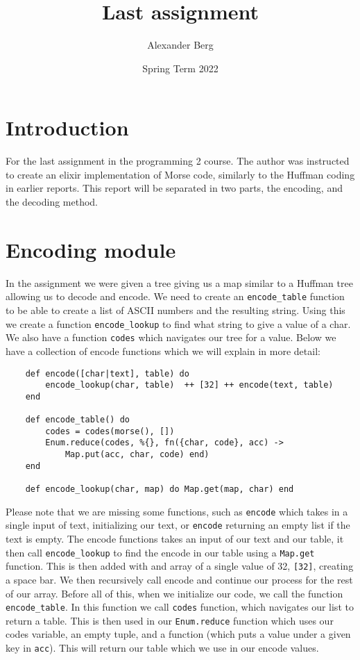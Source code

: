 \documentclass[a4paper,11pt]{article}
\begin{document}
\title{
    \textbf{Last assignment}
}
\author{Alexander Berg}
\date{Spring Term 2022}

\maketitle

\section*{Introduction}

For the last assignment in the programming 2 course. The author was instructed to create an elixir implementation of Morse code, similarly to the Huffman coding in earlier reports. This report will be separated in two parts, the encoding, and the decoding method. 

\section*{Encoding module}

In the assignment we were given a tree giving us a map similar to a Huffman tree allowing us to decode and encode. We need to create an {\tt encode\_table} function to be able to create a list of ASCII numbers and the resulting string. Using this we create a function {\tt encode\_lookup} to find what string to give a value of a char. We also have a function {\tt codes} which navigates our tree for a value. Below we have a collection of encode functions which we will explain in more detail:

\begin{verbatim}
    def encode([char|text], table) do
        encode_lookup(char, table)  ++ [32] ++ encode(text, table)
    end

    def encode_table() do
        codes = codes(morse(), [])
        Enum.reduce(codes, %{}, fn({char, code}, acc) ->
            Map.put(acc, char, code) end)
    end

    def encode_lookup(char, map) do Map.get(map, char) end
\end{verbatim}

Please note that we are missing some functions, such as {\tt encode} which takes in a single input of text, initializing our text, or {\tt encode} returning an empty list if the text is empty.
The encode functions takes an input of our text and our table, it then call {\tt encode\_lookup} to find the encode in our table using a {\tt Map.get} function. This is then added with and array of a single value of 32, {\tt [32]}, creating a space bar. We then recursively call encode and continue our process for the rest of our array. Before all of this, when we initialize our code, we call the function {\tt encode\_table}. In this function we call {\tt codes} function, which navigates our list to return a table. This is then used in our {\tt Enum.reduce} function which uses our codes variable, an empty tuple, and a function (which puts a value under a given key in {\tt acc}). This will return our table which we use in our encode values.
\end{document}
